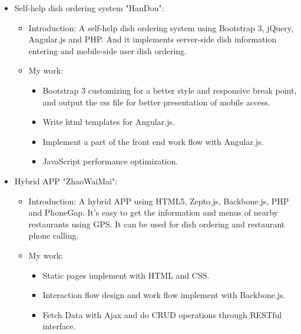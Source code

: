 \documentclass[11pt,a4paper,sans]{moderncv}        %
\begin{document}
{\begin{itemize}
\begin{itemize}
      \begin{itemize}%
        \item Mobile first and responsive design using HTML and CSS.
        \item Work flow design with Backbone.js.
        \item Algorithm implement of game rules with Underscore.js.
        \item Using pushstream.js and Nginx configurations to implement the function of html message push(such as Long polling, Web Socket and so on) in order to simulate the instant communications in multi-player games.
      \end{itemize}
  \end{itemize}
\item Self-help dish ordering system "HanDou":
  \begin{itemize}%
  \item Introduction: A self-help dish ordering system using Bootstrap 3, jQuery, Angular.js and PHP. And it implements server-side dish information entering and mobile-side user dish ordering.
  \item My work:
      \begin{itemize}%
        \item Bootstrap 3 customizing for a better style and responsive break point, and output the css file for better presentation of mobile access.
        \item Write html templates for Angular.js.
        \item Implement a part of the front end work flow with Angular.js.
        \item JavaScript performance optimization.
      \end{itemize}
  \end{itemize}
\item Hybrid APP "ZhaoWaiMai":
  \begin{itemize}%
  \item Introduction: A hybrid APP using HTML5, Zepto.js, Backbone.js, PHP and PhoneGap. It's easy to get the information and menus of nearby restaurants using GPS. It can be used for dish ordering and restaurant phone calling.
  \item My work:
      \begin{itemize}%
        \item Static pages implement with HTML and CSS.
        \item Interaction flow design and work flow implement with Backbone.js.
        \item Fetch Data with Ajax and do CRUD operations through RESTful interface.
      \end{itemize}
  \end{itemize}
\end{itemize}}
\end{document}
